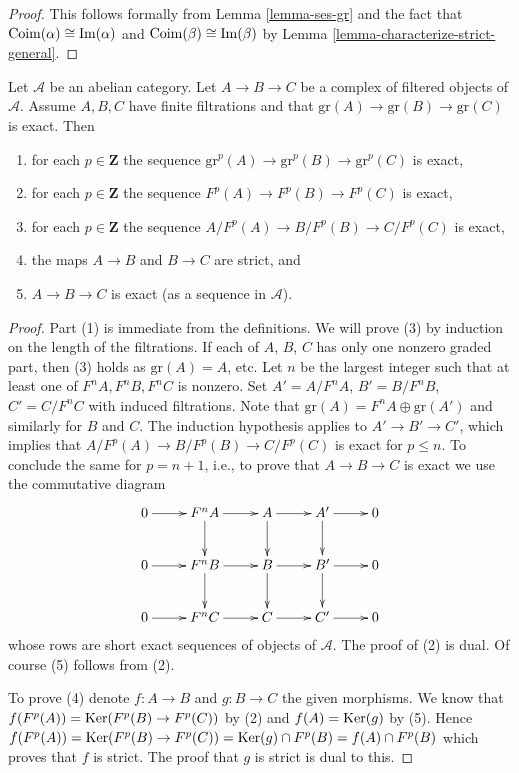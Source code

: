 \begin{proof}
This follows formally from
Lemma \ref{lemma-ses-gr}
and the fact that
$\mathop{\mathrm{Coim}}(\alpha) \cong \mathop{\mathrm{Im}}(\alpha)$ and
$\mathop{\mathrm{Coim}}(\beta) \cong \mathop{\mathrm{Im}}(\beta)$ by
Lemma \ref{lemma-characterize-strict-general}.
\end{proof}

\begin{lemma}
\label{lemma-filtered-acyclic}
Let $\mathcal{A}$ be an abelian category.
Let $A \to B \to C$ be a complex of filtered objects of $\mathcal{A}$.
Assume $A, B, C$ have finite filtrations and that
$\text{gr}(A) \to \text{gr}(B) \to \text{gr}(C)$ is exact.
Then
\begin{enumerate}
\item for each $p \in \mathbf{Z}$ the sequence
$\text{gr}^p(A) \to \text{gr}^p(B) \to \text{gr}^p(C)$ is exact,
\item for each $p \in \mathbf{Z}$ the sequence
$F^p(A) \to F^p(B) \to F^p(C)$ is exact,
\item for each $p \in \mathbf{Z}$ the sequence
$A/F^p(A) \to B/F^p(B) \to C/F^p(C)$ is exact,
\item the maps $A \to B$ and $B \to C$ are strict, and
\item $A \to B \to C$ is exact (as a sequence in $\mathcal{A}$).
\end{enumerate}
\end{lemma}

\begin{proof}
Part (1) is immediate from the definitions.
We will prove (3) by induction on the length of the filtrations.
If each of $A$, $B$, $C$ has only one
nonzero graded part, then (3) holds as $\text{gr}(A) = A$, etc.
Let $n$ be the largest integer such that at least one of
$F^nA, F^nB, F^nC$ is nonzero. Set $A' = A/F^nA$, $B' = B/F^nB$,
$C' = C/F^nC$ with induced filtrations. Note that
$\text{gr}(A) = F^nA \oplus \text{gr}(A')$
and similarly for $B$ and $C$. The induction hypothesis
applies to $A' \to B' \to C'$, which implies that
$A/F^p(A) \to B/F^p(B) \to C/F^p(C)$ is exact for $p \leq n$.
To conclude the same for $p = n + 1$, i.e., to prove that $A \to B \to C$
is exact we use the commutative diagram
$$
\xymatrix{
0 \ar[r] & F^nA \ar[r] \ar[d] & A \ar[r] \ar[d] & A' \ar[r] \ar[d] & 0 \\
0 \ar[r] & F^nB \ar[r] \ar[d] & B \ar[r] \ar[d] & B' \ar[r] \ar[d] & 0 \\
0 \ar[r] & F^nC \ar[r] & C \ar[r] & C' \ar[r] & 0
}
$$
whose rows are short exact sequences of objects of $\mathcal{A}$.
The proof of (2) is dual. Of course (5) follows from (2).

\medskip\noindent
To prove (4) denote $f : A \to B$ and $g : B \to C$ the given morphisms.
We know that $f(F^p(A)) = \mathop{\mathrm{Ker}}(F^p(B) \to F^p(C))$ by (2) and
$f(A) = \mathop{\mathrm{Ker}}(g)$ by (5). Hence
$f(F^p(A)) =  \mathop{\mathrm{Ker}}(F^p(B) \to F^p(C)) =
\mathop{\mathrm{Ker}}(g) \cap F^p(B) = f(A) \cap F^p(B)$ which proves that
$f$ is strict. The proof that $g$ is strict is dual to this.
\end{proof}











